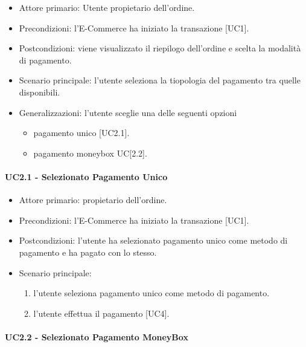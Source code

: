 \begin{itemize}
    \item Attore primario: Utente propietario dell'ordine.
    \item Precondizioni: l'E-Commerce ha iniziato la transazione [UC1].
    \item Postcondizioni: viene visualizzato il riepilogo dell'ordine e scelta la modalità di pagamento.
    \item Scenario principale: l'utente seleziona la tiopologia del pagamento tra quelle disponibili.
    \item Generalizzazioni: l'utente sceglie una delle seguenti opzioni\begin{itemize}
        \item pagamento unico [UC2.1].
        \item pagamento moneybox UC[2.2].
    \end{itemize}
\end{itemize}

\paragraph{UC2.1 - Selezionato Pagamento Unico}

\begin{itemize}
    \item Attore primario: propietario dell'ordine.
    \item Precondizioni: l'E-Commerce ha iniziato la transazione [UC1].
    \item Postcondizioni: l'utente ha selezionato pagamento unico come metodo di pagamento e ha pagato con lo stesso.
    \item Scenario principale: \begin{enumerate}
        \item l'utente seleziona pagamento unico come metodo di pagamento.
        \item l'utente effettua il pagamento [UC4].
    \end{enumerate}
\end{itemize}

\paragraph{UC2.2 -  Selezionato Pagamento MoneyBox}

